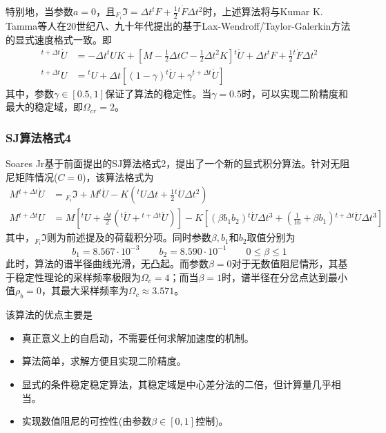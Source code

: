 特别地，当参数$a=0$，且${_{F_i}\!\Im}=\Delta t{^t\!F}+\frac{1}{2}{^t\!\dot{F}}\Delta t^2$时，上述算法将与Kumar K. Tamma等人在20世纪八、九十年代提出的基于Lax-Wendroff/Taylor-Galerkin方法的显式速度格式\cite{Tamma1988f,Tamma1988d,Tamma1989a,Tamma1990c}一致。即
\begin{align}
[M+\frac{1}{2}C\Delta t]{^{t+\Delta t}\!\dot{U}}&=-\Delta t{^t\!U}K+[M-\frac{1}{2}\Delta tC-\frac{1}{2}\Delta t^2K]{^t\!\dot{U}}+\Delta t{^t\!F}+\frac{1}{2}{^t\!\dot{F}}\Delta t^2\\
{^{t+\Delta t}\!U}&={^t\!U}+\Delta t[(1-\gamma){^t\!\dot{U}}+\gamma{^{t+\Delta t}\!\dot{U}}]
\end{align}
其中，参数$\gamma\in[0.5,1]$保证了算法的稳定性。当$\gamma=0.5$时，可以实现二阶精度和最大的稳定域，即$\Omega_{cr}=2$。

\subsubsection{SJ算法格式4\cite{SoaresJr2016a}}
Soares Jr基于前面提出的SJ算法格式2\cite{Jr2014}，提出了一个新的显式积分算法\cite{SoaresJr2016a}。针对无阻尼矩阵情况($C=0$)，该算法格式为
\begin{align}
 M{^{t+\Delta t}\!\dot{U}}&={_{F_i}\!\Im}+M{^t\!\dot{U}}-K({^t\!U}\Delta t+\frac12{^t\!\dot{U}}\Delta t^2)\\
 M{^{t+\Delta t}\!U}&=M[{^t\!U}+\frac{\Delta t}{2}({^t\!\dot{U}}+{^{t+\Delta t}\!\dot{U}})]-K[(\beta b_1b_2){^t\!\dot{U}}\Delta t^3+(\frac{1}{16}+\beta b_1){^{t+\Delta t}\!\dot{U}}\Delta t^3]
\end{align}
其中，${_{F_i}\!\Im}$则为前述提及的荷载积分项。同时参数$\beta,b_1$和$b_2$取值分别为
\begin{equation}
b_1=8.567\cdot10^{-3}\qquad b_2=8.590\cdot10^{-1}\qquad 0\le\beta\le1
\end{equation}
此时，算法的谱半径曲线光滑，无凸起。而参数$\beta=0$对于无数值阻尼情形，其基于稳定性理论的采样频率极限为$\Omega_c=4$；而当$\beta=1$时，谱半径在分岔点达到最小值$\rho_b=0$，其最大采样频率为$\Omega_c\approx3.571$。

该算法的优点主要是
\begin{itemize}
\item[\ddag] 真正意义上的自启动，不需要任何求解加速度的机制。
\item[\ddag] 算法简单，求解方便且实现二阶精度。
\item[\ddag] 显式的条件稳定稳定算法，其稳定域是中心差分法的二倍，但计算量几乎相当。
\item[\ddag] 实现数值阻尼的可控性(由参数$\beta\in[0,1]$控制)。
\end{itemize}

